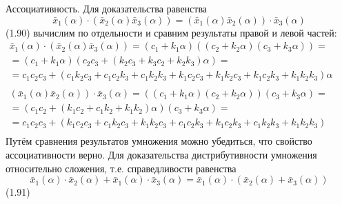 Ассоциативность. Для доказательства равенства
	\[{{\bar{x}}_{1}}\left( \alpha  \right)\cdot \left( {{{\bar{x}}}_{2}}\left( \alpha  \right){{{\bar{x}}}_{3}}\left( \alpha  \right) \right)=\left( {{{\bar{x}}}_{1}}\left( \alpha  \right){{{\bar{x}}}_{2}}\left( \alpha  \right) \right)\cdot {{\bar{x}}_{3}}\left( \alpha  \right)\] 	(1.90)
вычислим по отдельности и сравним результаты правой и левой частей:
$\begin{matrix}
  {{{\bar{x}}}_{1}}\left( \alpha  \right)\cdot \left( {{{\bar{x}}}_{2}}\left( \alpha  \right){{{\bar{x}}}_{3}}\left( \alpha  \right) \right)=\left( {{c}_{1}}+{{k}_{1}}\alpha  \right)\left( \left( {{c}_{2}}+{{k}_{2}}\alpha  \right)\left( {{c}_{3}}+{{k}_{3}}\alpha  \right) \right)= \\ 
  =\left( {{c}_{1}}+{{k}_{1}}\alpha  \right)\left( {{c}_{2}}{{c}_{3}}+\left( {{k}_{2}}{{c}_{3}}+{{k}_{3}}{{c}_{2}}+{{k}_{2}}{{k}_{3}} \right)\alpha  \right)= \\ 
  ={{c}_{1}}{{c}_{2}}{{c}_{3}}+\left( {{c}_{1}}{{k}_{2}}{{c}_{3}}+{{c}_{1}}{{c}_{2}}{{k}_{3}}+{{c}_{1}}{{k}_{2}}{{k}_{3}}+{{k}_{1}}{{c}_{2}}{{c}_{3}}+{{k}_{1}}{{k}_{2}}{{c}_{3}}+{{k}_{1}}{{c}_{2}}{{k}_{3}}+{{k}_{1}}{{k}_{2}}{{k}_{3}} \right)\alpha  \\ 
\end{matrix}$ 
$\begin{matrix}
  \left( {{{\bar{x}}}_{1}}\left( \alpha  \right){{{\bar{x}}}_{2}}\left( \alpha  \right) \right)\cdot {{{\bar{x}}}_{3}}\left( \alpha  \right)=\left( \left( {{c}_{1}}+{{k}_{1}}\alpha  \right)\left( {{c}_{2}}+{{k}_{2}}\alpha  \right) \right)\left( {{c}_{3}}+{{k}_{3}}\alpha  \right)= \\ 
  =\left( {{c}_{1}}{{c}_{2}}+\left( {{k}_{1}}{{c}_{2}}+{{c}_{1}}{{k}_{2}}+{{k}_{1}}{{k}_{2}} \right)\alpha  \right)\left( {{c}_{3}}+{{k}_{3}}\alpha  \right)= \\ 
  ={{c}_{1}}{{c}_{2}}{{c}_{3}}+\left( {{k}_{1}}{{c}_{2}}{{c}_{3}}+{{c}_{1}}{{k}_{2}}{{c}_{3}}+{{k}_{1}}{{k}_{2}}{{c}_{3}}+{{c}_{1}}{{c}_{2}}{{k}_{3}}+{{k}_{1}}{{c}_{2}}{{k}_{3}}+{{c}_{1}}{{k}_{2}}{{k}_{3}}+{{k}_{1}}{{k}_{2}}{{k}_{3}} \right) \\ 
\end{matrix}$ 
Путём сравнения результатов умножения можно убедиться, что свойство ассоциативности верно.
Для доказательства дистрибутивности умножения относительно сложения, т.е. справедливости равенства 
	\[{{\bar{x}}_{1}}(\alpha )\cdot {{\bar{x}}_{2}}(\alpha )+{{\bar{x}}_{1}}(\alpha )\cdot {{\bar{x}}_{3}}(\alpha )={{\bar{x}}_{1}}(\alpha )\cdot ({{\bar{x}}_{2}}(\alpha )+{{\bar{x}}_{3}}(\alpha ))\] 	(1.91)

